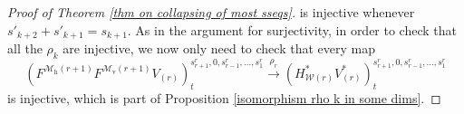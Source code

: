 \documentclass[11pt]{amsart} \renewcommand{\baselinestretch}{1.2}
\theoremstyle{plain}
\numberwithin{equation}{section} %
\theoremstyle{plain}
\numberwithin{equation}{chapter} %
\renewcommand{\to}{\longrightarrow}
\newcommand{\calV}{\mathcal{V}}
\newcommand{\calw}{\mathcal{W}}
\newcommand{\calMv}{\mathcal{M}\dver}
\newcommand{\calMh}{\mathcal{M}\dhor}
\newcommand{\vect}[2]{\calV^{#1}_{#2}}
\newcommand{\UEAX}{\bar{X}'}%
\newcommand{\dver}{_\mathrm{v}}
\newcommand{\dhor}{_\mathrm{h}}
\newcommand{\Sqh}{\mathrm{Sq}\dhor}
\begin{document}
\begin{Calculations of HWn}
\begin{proof}[Proof of Theorem \ref{thm on collapsing of most sseqs}]
is injective whenever $s'_{k+2}+s'_{k+1}=s_{k+1}$. As in the argument for surjectivity, in order to check that all the $\rho_k$ are injective, we now only need to check that every map
\[(F^{\calMh(r+1)}F^{\calMv(r+1)}V_{(r)})^{s_{r+1}^{r},0,s_{r-1}^{r},\ldots,s_1^{r}}_{t} \overset{\rho_r}{\to}(H^*_{\calw(r)}V^*_{(r)})^{s_{r+1}^{r},0,s_{r-1}^{r},\ldots,s_1^{r}}_{t}\]
is injective, which is part of Proposition \ref{isomorphism rho k in some dims}.
%

\end{proof}
\end{Calculations of HWn}
\end{document}

